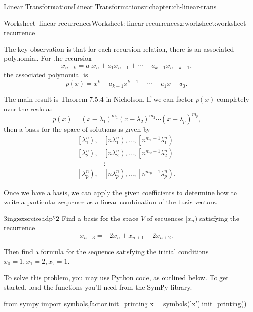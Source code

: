 \documentclass[oneside,10pt,]{book}
\numberwithin{equation}{section}
\newcommand{\amp}{&}
\begin{document}
\begin{chapterptx}{Linear Transformations}{}{Linear Transformations}{}{}{x:chapter:ch-linear-trans}
\begin{worksheet-section}{Worksheet: linear recurrences}{}{Worksheet: linear recurrences}{}{}{x:worksheet:worksheet-recurrence}
\begin{itemize}[label=\textbullet]
\end{itemize}
%
\par
The key observation is that for each recursion relation, there is an associated polynomial. For the recursion%
\begin{equation*}
x_{n+k} = a_0x_n + a_1x_{n+1}+\cdots + a_{k-1}x_{n+k-1}\text{,}
\end{equation*}
the associated polynomial is%
\begin{equation*}
p(x) = x^k - a_{k-1}x^{k-1}-\cdots -a_1x-a_0\text{.}
\end{equation*}
%
\par
The main result is Theorem 7.5.4 in Nicholson. If we can factor \(p(x)\) completely over the reals as%
\begin{equation*}
p(x) = (x-\lambda_1)^{m_1}(x-\lambda_2)^{m_2}\cdots (x-\lambda_p)^{m_p}\text{,}
\end{equation*}
then a basis for the space of solutions is given by%
\begin{align*}
\left[\lambda_1^n\right), \amp \left[n\lambda_1^n\right),\ldots, \left[n^{m_1-1}\lambda_1^n\right)\\
\left[\lambda_2^n\right), \amp \left[n\lambda_2^n\right),\ldots, \left[n^{m_2-1}\lambda_2^n\right)\\
\amp \vdots \\
\left[\lambda_p^n\right), \amp \left[n\lambda_p^n\right),\ldots, \left[n^{m_p-1}\lambda_p^n\right)\text{.}
\end{align*}
%
\par
Once we have a basis, we can apply the given coefficients to determine how to write a particular sequence as a linear combination of the basis vectors.%
\clearpage
\begin{divisionexercise}{1}{}{3in}{g:exercise:idp72}%
Find a basis for the space \(V\) of sequences \([x_n)\) satisfying the recurrence%
\begin{equation*}
x_{n+3}=-2x_n+x_{n+1}+2x_{n+2}\text{.}
\end{equation*}
%
\par
Then find a formula for the sequence satisfying the initial conditions \(x_0=1, x_1=2, x_2=1\).%
\end{divisionexercise}%
To solve this problem, you may use Python code, as outlined below. To get started, load the functions you'll need from the SymPy library.%
\begin{sageinput}
from sympy import symbols,factor,init_printing
x = symbols('x')
init_printing()
\end{sageinput}

\end{worksheet-section}
\end{chapterptx}
\end{document}
